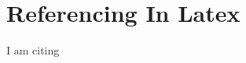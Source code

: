 \documentclass{article}
\begin{document}
\section{Referencing In Latex}
I am citing \cite{einstein}





\printbibliography
\end{document}
